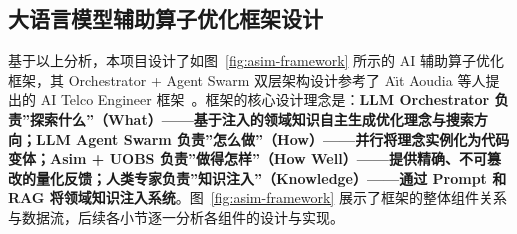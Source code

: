 \documentclass{CjC}
\begin{document}
    \subsection{大语言模型辅助算子优化框架设计}

    基于以上分析，本项目设计了如图~\ref{fig:asim-framework} 所示的 AI 辅助算子优化框架，其
    Orchestrator + Agent Swarm 双层架构设计参考了 A\"{\i}t Aoudia 等人提出的 AI
    Telco Engineer 框架~\cite{aitaoudia2026aitelcoengineer}。框架的核心设计理念是：\textbf{LLM
    Orchestrator
    负责”探索什么”（What）——基于注入的领域知识自主生成优化理念与搜索方向；LLM
    Agent Swarm 负责”怎么做”（How）——并行将理念实例化为代码变体；Asim + UOBS
    负责”做得怎样”（How
    Well）——提供精确、不可篡改的量化反馈；人类专家负责”知识注入”（Knowledge）——通过
    Prompt 和 RAG 将领域知识注入系统}。图~\ref{fig:asim-framework}
    展示了框架的整体组件关系与数据流，后续各小节逐一分析各组件的设计与实现。
\end{document}
